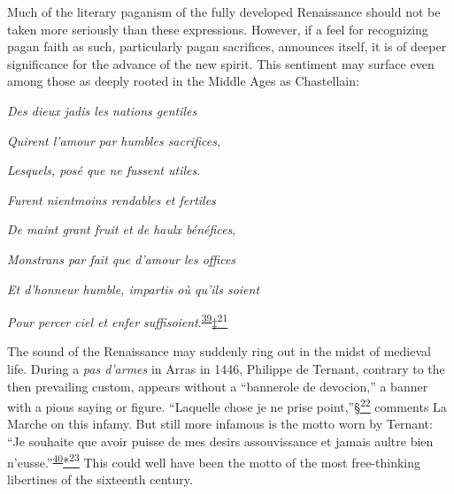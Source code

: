 Much of the literary paganism of the fully developed Renaissance should
not be taken more seriously than these expressions. However, if a feel
for recognizing pagan faith as such, particularly pagan sacrifices,
announces itself, it is of deeper significance for the advance of the
new spirit. This sentiment may surface even among those as deeply rooted
in the Middle Ages as Chastellain:

\emph{Des dieux jadis les nations gentiles}

\emph{Quirent l'amour par humbles sacrifices},

\emph{Lesquels, posé que ne fussent utiles}.

\emph{Furent nientmoins rendables et fertiles}

\emph{De maint grant fruit et de haulx bénéfices},

\emph{Monstrans par fait que d'amour les offices}

\emph{Et d'honneur humble, impartis où qu'ils soient}

\emph{Pour percer ciel et enfer
suffisoient}.\textsuperscript{\protect\hypertarget{22_Chapter_Fourteen__THE_COMING_OF.xhtmlux5cux23id_47}{\protect\hyperlink{23_NOTES.xhtmlux5cux23id_48}{39}}}\protect\hypertarget{22_Chapter_Fourteen__THE_COMING_OF.xhtmlux5cux23id_2771}{\protect\hyperlink{23_NOTES.xhtmlux5cux23id_2772}{‡\textsuperscript{21}}}

The sound of the Renaissance may suddenly ring out in the midst of
medieval life. During a \emph{pas d'armes} in Arras in 1446, Philippe de
Ternant, contrary to the then prevailing custom, appears without a
``bannerole de devocion,'' a banner with a pious saying or figure.
``Laquelle chose je ne prise
point,''\protect\hypertarget{22_Chapter_Fourteen__THE_COMING_OF.xhtmlux5cux23id_2769}{\protect\hyperlink{23_NOTES.xhtmlux5cux23id_2770}{§\textsuperscript{22}}}
comments La Marche on this infamy. But still more infamous is the motto
worn by Ternant:
\protect\hypertarget{22_Chapter_Fourteen__THE_COMING_OF.xhtmlux5cux23page_395}{}{}``Je
souhaite que avoir puisse de mes desirs assouvissance et jamais aultre
bien
n'eusse.''\textsuperscript{\protect\hypertarget{22_Chapter_Fourteen__THE_COMING_OF.xhtmlux5cux23id_45}{\protect\hyperlink{23_NOTES.xhtmlux5cux23id_46}{40}}}\protect\hypertarget{22_Chapter_Fourteen__THE_COMING_OF.xhtmlux5cux23id_2767}{\protect\hyperlink{23_NOTES.xhtmlux5cux23id_2768}{*\textsuperscript{23}}}
This could well have been the motto of the most free-thinking libertines
of the sixteenth century.

